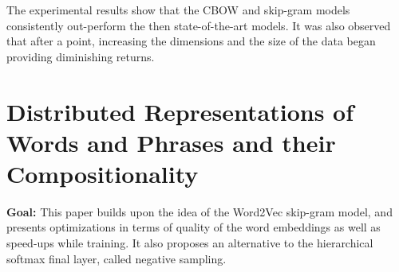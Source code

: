 \documentclass[11pt,a4paper]{article}
\begin{document}
  The experimental results show that the CBOW and skip-gram models consistently out-perform the then state-of-the-art models. It was also observed that after a point, increasing the dimensions and the size of the data began providing diminishing returns.



\section{Distributed Representations of Words and Phrases and their Compositionality} %
\label{sec:distributed_representations_of_words_and_phrases_and_their_compositionality}

  \textbf{Goal:}
  This paper builds upon the idea of the Word2Vec skip-gram model, and presents optimizations in terms of quality of the word embeddings as well as speed-ups while training. It also proposes an alternative to the hierarchical softmax final layer, called negative sampling\cite{mikolov2013distributed}.\\
\end{document}
